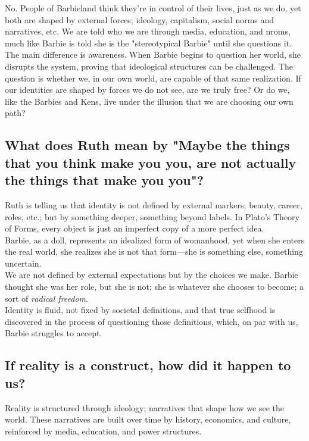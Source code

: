 No. People of Barbieland think they're in control of their lives,
just as we do, yet both are shaped by external forces; ideology, capitalism,
social norms and narratives, etc. We are told who we are through media, education,
and nroms, much like Barbie is told she is the "stereotypical Barbie" until she questions it. \\

The main difference is awareness. When Barbie begins to question her world, 
she disrupts the system, proving that ideological structures can be challenged. 
The question is whether we, in our own world, are capable of that same realization. 
If our identities are shaped by forces we do not see, are we truly free? 
Or do we, like the Barbies and Kens, live under the illusion that we are choosing our own path? \\

\subsection{What does Ruth mean by "Maybe the things that you think make you you, are not actually the things that make you you"?} 
Ruth is telling us that identity is not defined by external markers; beauty, career, roles, etc.; 
but by something deeper, something beyond labels. In Plato’s Theory of Forms, 
every object is just an imperfect copy of a more perfect idea. \\

Barbie, as a doll, represents an idealized form of womanhood, yet when she 
enters the real world, she realizes she is not that form—she is something else, something uncertain.  \\

We are not defined by external expectations but by the choices we make. Barbie thought she was her role, 
but she is not; she is whatever she chooses to become; a sort of \textit{radical freedom}. \\

Identity is fluid, not fixed by societal definitions, and that true selfhood is 
discovered in the process of questioning those definitions,  
which, on par with us, Barbie struggles to accept. \\

\subsection{If reality is a construct, how did it happen to us?}
Reality is structured through ideology; narratives that shape how we see the world. 
These narratives are built over time by history, economics, and culture, 
reinforced by media, education, and power structures. \\

